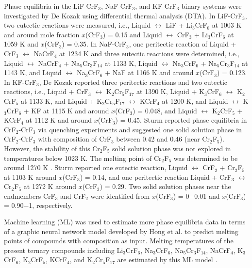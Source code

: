 Phase equilibria in the LiF-CrF${_3}$, NaF-CrF${_3}$, and KF-CrF${_3}$ binary systems were investigated by De Kozak \cite{de1975systeme, DeKozak1969} using differential thermal analysis (DTA). In LiF-CrF${_3}$, two eutectic reactions were measured, i.e., Liquid $\leftrightarrow$ LiF + Li$_3$CrF$_6$ at 1003 K and around mole fraction $x$(CrF${_3}$) = 0.15 and Liquid $\leftrightarrow$ CrF${_3}$ + Li$_3$CrF$_6$ at 1059 K and $x$(CrF${_3}$) = 0.35. In NaF-CrF${_3}$, one peritectic reaction of Liquid + CrF${_3}$ $\leftrightarrow$ NaCrF$_4$ at 1234 K and three eutectic reactions were determined, i.e., Liquid $\leftrightarrow$ NaCrF$_4$ + Na$_5$Cr$_3$F$_{14}$ at 1133 K, Liquid $\leftrightarrow$ Na$_3$CrF$_6$ + Na$_5$Cr$_3$F$_{14}$ at 1143 K, and Liquid $\leftrightarrow$ Na$_3$CrF$_6$ + NaF at 1166 K and around $x$(CrF${_3}$) = 0.123. In KF-CrF${_3}$, De Kozak \cite{de1975systeme, DeKozak1969} reported three peritectic reactions and two eutectic reactions, i.e., Liquid + CrF${_3}$ $\leftrightarrow$ K$_2$Cr$_5$F$_{17}$ at 1390 K, Liquid + K$_3$CrF$_6$ $\leftrightarrow$ K$_2$CrF$_5$ at 1133 K, and Liquid + K$_2$Cr$_5$F$_{17}$ $\leftrightarrow$ KCrF$_4$ at 1200 K, and Liquid $\leftrightarrow$ K$_3$CrF$_6$ + KF at 1115 K and around $x$(CrF${_3}$) = 0.048, and Liquid $\leftrightarrow$ K$_2$CrF$_5$ + KCrF$_4$ at 1112 K and around $x$(CrF${_3}$) = 0.45. Sturm \cite{sturm1962phase} reported phase equilibria in CrF${_2}$-CrF${_3}$ via quenching experiments and suggested one solid solution phase in CrF${_2}$-CrF${_3}$ with composition of CrF${_3}$ between 0.42 and 0.46 (near Cr$_2$F$_5$). However, the stability of this Cr$_2$F$_5$ solid solution phase was not explored in temperatures below 1023 K. The melting point of Cr$_2$F$_5$ was determined to be around 1270 K \cite{sturm1962phase}. Sturm \cite{sturm1962phase} reported one eutectic reaction, Liquid $\leftrightarrow$ CrF${_2}$ + Cr$_2$F$_5$ at 1103 K around $x$(CrF${_3}$) = 0.14, and one peritectic reaction Liquid + CrF${_3}$ $\leftrightarrow$ Cr$_2$F$_5$ at 1272 K around $x$(CrF${_3}$) = 0.29. Two solid solution phases near the endmembers CrF${_3}$ and CrF${_2}$ were identified from $x$(CrF${_3}$) = 0$-$0.01 and $x$(CrF${_3}$) = 0.90$-$1, respectively. 

Machine learning (ML) was used to estimate more phase equilibria data in terms of a graphic neural network model developed by Hong et al. \cite{hong2022melting} to predict melting points of compounds with composition as input. Melting temperatures of the present ternary compounds including Li$_3$CrF$_6$, Na$_3$CrF$_6$, Na$_5$Cr$_3$F$_{14}$, NaCrF$_4$, K$_3$CrF$_6$, K$_2$CrF$_5$, KCrF$_4$, and K$_2$Cr$_5$F$_{17}$ are estimated by this ML model \cite{hong2022melting}. 

